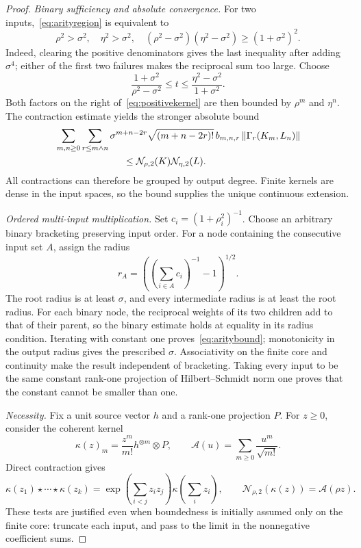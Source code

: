 \documentclass[11pt,a4paper]{amsart}
\numberwithin{equation}{section}
\theoremstyle{definition}
\theoremstyle{remark}
\newcommand{\norm}[1]{\left\lVert#1\right\rVert}
\begin{document}
\begin{proof}
\emph{Binary sufficiency and absolute convergence.}
For two inputs,~\eqref{eq:arityregion} is equivalent to
\begin{equation}\label{eq:binaryregion}
 \rho^2>\sigma^2,\quad\eta^2>\sigma^2,\quad
 (\rho^2-\sigma^2)(\eta^2-\sigma^2)\ge(1+\sigma^2)^2.
\end{equation}
Indeed, clearing the positive denominators gives the last inequality after adding $\sigma^4$; either of the first two failures makes the reciprocal sum too large. Choose
\[
 \frac{1+\sigma^2}{\rho^2-\sigma^2}\le t
 \le\frac{\eta^2-\sigma^2}{1+\sigma^2}.
\]
Both factors on the right of~\eqref{eq:positivekernel} are then bounded by $\rho^m$ and $\eta^n$. The contraction estimate yields the stronger absolute bound
\begin{equation}\label{eq:absolutecontraction}
 \begin{split}
 &\sum_{m,n\ge0}\sum_{r\le m\wedge n}
 \sigma^{m+n-2r}\sqrt{(m+n-2r)!}\,b_{m,n,r}
       \norm{\Gamma_r(K_m,L_n)}\\
 &\hspace{25mm}\le\mathcal N_{\rho,2}(K)\mathcal N_{\eta,2}(L).
 \end{split}
\end{equation}
All contractions can therefore be grouped by output degree. Finite kernels are dense in the input spaces, so the bound supplies the unique continuous extension.

\emph{Ordered multi-input multiplication.}
Set $c_i=(1+\rho_i^2)^{-1}$. Choose an arbitrary binary bracketing preserving input order. For a node containing the consecutive input set $A$, assign the radius
\[
 r_A=\left(\left(\sum_{i\in A}c_i\right)^{-1}-1\right)^{1/2}.
\]
The root radius is at least $\sigma$, and every intermediate radius is at least the root radius. For each binary node, the reciprocal weights of its two children add to that of their parent, so the binary estimate holds at equality in its radius condition. Iterating with constant one proves~\eqref{eq:aritybound}; monotonicity in the output radius gives the prescribed $\sigma$. Associativity on the finite core and continuity make the result independent of bracketing. Taking every input to be the same constant rank-one projection of Hilbert--Schmidt norm one proves that the constant cannot be smaller than one.

\emph{Necessity.}
Fix a unit source vector $h$ and a rank-one projection $P$. For $z\ge0$, consider the coherent kernel
\[
 \kappa(z)_m=\frac{z^m}{m!}h^{\otimes m}\otimes P,
 \qquad\mathcal A(u)=\sum_{m\ge0}\frac{u^m}{\sqrt{m!}}.
\]
Direct contraction gives
\[
 \kappa(z_1)\star\cdots\star\kappa(z_k)
 =\exp\left(\sum_{i<j}z_iz_j\right)\kappa\left(\sum_i z_i\right),
 \qquad\mathcal N_{\rho,2}(\kappa(z))=\mathcal A(\rho z).
\]
These tests are justified even when boundedness is initially assumed only on the finite core: truncate each input, and pass to the limit in the nonnegative coefficient sums.


\end{proof}
\end{document}
